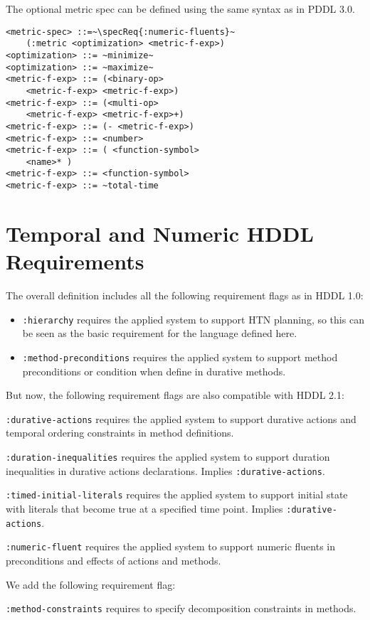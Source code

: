 \documentclass[letterpaper]{article} %
\begin{document}
%
%

The optional metric spec can be defined using the same syntax as in PDDL 3.0.

\begin{lstlisting}[firstnumber=last, escapechar=~]
<metric-spec> ::=~\specReq{:numeric-fluents}~
    (:metric <optimization> <metric-f-exp>)
<optimization> ::= ~minimize~
<optimization> ::= ~maximize~
<metric-f-exp> ::= (<binary-op>
    <metric-f-exp> <metric-f-exp>)
<metric-f-exp> ::= (<multi-op>
    <metric-f-exp> <metric-f-exp>+)
<metric-f-exp> ::= (- <metric-f-exp>)
<metric-f-exp> ::= <number>
<metric-f-exp> ::= ( <function-symbol>
    <name>* )
<metric-f-exp> ::= <function-symbol>
<metric-f-exp> ::= ~total-time
\end{lstlisting}

\section{Temporal and Numeric HDDL Requirements}
\label{Sec:Requirements}
The overall definition includes all the following requirement flags as in HDDL 1.0:
\begin{itemize}
 \item \verb+:hierarchy+ requires the applied system to support HTN planning, so this can be seen as the basic requirement for the language defined here.
 \item \verb+:method-preconditions+ requires the applied system to support method preconditions or condition when define in durative methods.
\end{itemize}
But now, the following requirement flags are also compatible with HDDL 2.1:
\begin{description}
 \item \verb+:durative-actions+ requires the applied system to support durative actions and temporal ordering constraints in method definitions.
 \item \verb+:duration-inequalities+ requires the applied system to support duration inequalities in durative actions declarations. Implies \verb+:durative-actions+.
 \item \verb+:timed-initial-literals+ requires the applied system to support initial state with literals that become true at a specified time point. Implies \verb+:durative-actions+.
 \item \verb+:numeric-fluent+ requires the applied system to support numeric fluents in preconditions and effects of actions and methods.
 \end{description}
 We add the following requirement flag:
\begin{description}
\item \verb+:method-constraints+ requires to specify decomposition constraints in methods.
 \end{description}
\end{document}
